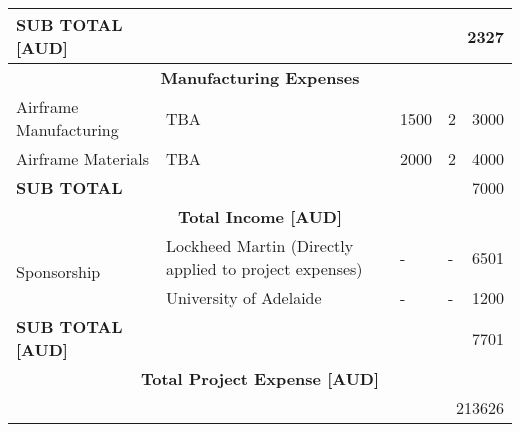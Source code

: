 \begin{table}[h]
{\begin{tabular}{|l|l|l|l|r|}
\textbf{SUB TOTAL {[}AUD{]}}                                 & \multicolumn{4}{r|}{2327}                                                                                                                                 \\ \hline
\multicolumn{5}{|c|}{\textbf{Manufacturing Expenses}}                                                                                                                                                          \\ \hline
Airframe Manufacturing                             & TBA                                & 1500                                 & 2                             & 3000                                          \\ \hline
Airframe Materials                                  & TBA                                & 2000                                 & 2                             & 4000                                          \\ \hline
\textbf{SUB TOTAL}                                 & \multicolumn{4}{r|}{7000}                                                                                                                                 \\ \hline
\multicolumn{5}{|c|}{\textbf{Total Income {[}AUD{]}}}                                                                                                                                                          \\ \hline
\multirow{2}{*}{Sponsorship}                       & Lockheed Martin (Directly applied to project expenses)                    & -                                    & -                             & 6501                                          \\ \cline{2-5} 
                                                   & University of Adelaide             & -                                    & -                             & 1200                                          \\ \hline
\textbf{SUB TOTAL {[}AUD{]}}                                 & \multicolumn{4}{r|}{7701}                                                                                                                                 \\ \hline
\multicolumn{5}{|c|}{\textbf{Total Project Expense {[}AUD{]}}}                                                                                                                                                 \\ \hline
\multicolumn{5}{|r|}{213626}                                                                                                                                                                                   \\ \hline
\end{tabular}}
\end{table}


